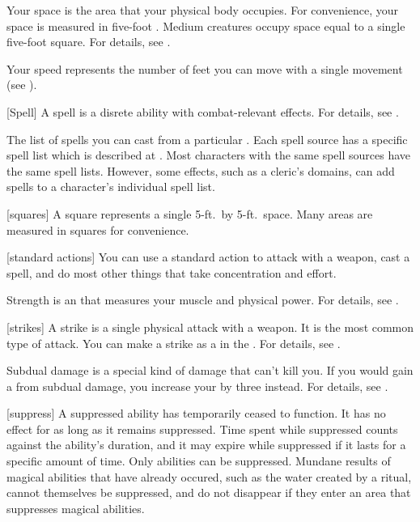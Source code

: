  Your space is the area that your physical body occupies.
For convenience, your space is measured in five-foot .
Medium creatures occupy space equal to a single five-foot square.
For details, see .

 Your speed represents the number of feet you can move with a single movement (see ).

[Spell] A spell is a disrete \magical ability with combat-relevant effects.
For details, see .

 The list of spells you can cast from a particular .
Each spell source has a specific spell list which is described at .
Most characters with the same spell sources have the same spell lists.
However, some effects, such as a cleric's domains, can add spells to a character's individual spell list.

[squares] A square represents a single 5-ft.\ by 5-ft.\ space.
Many areas are measured in squares for convenience.

[standard actions] You can use a standard action to attack with a weapon, cast a spell, and do most other things that take concentration and effort.

 Strength is an  that measures your muscle and physical power.
For details, see .

[strikes] A strike is a single physical attack with a weapon.
It is the most common type of attack.
You can make a strike as a  in the .
For details, see .

 Subdual damage is a special kind of damage that can't kill you.
If you would gain a  from subdual damage, you increase your  by three instead.
For details, see .

[suppress] A suppressed ability has temporarily ceased to function.
It has no effect for as long as it remains suppressed.
Time spent while suppressed counts against the ability's duration, and it may expire while suppressed if it lasts for a specific amount of time.
Only \magical abilities can be suppressed.
Mundane results of magical abilities that have already occured, such as the water created by a  ritual, cannot themselves be suppressed, and do not disappear if they enter an area that suppresses magical abilities.

